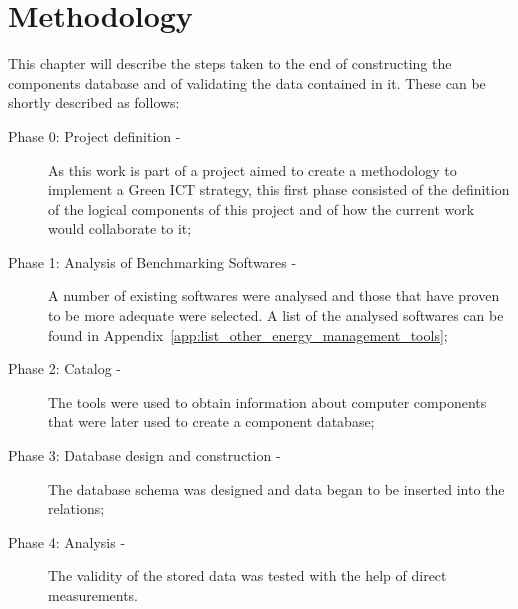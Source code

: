 

\chapter{Methodology} \label{chap3:methodology}

   This chapter will describe the steps taken to the end of constructing the components database and of validating the data contained in it.
These can be shortly described as follows:
    \begin{description}
        \item[Phase 0: Project definition -] As this work is part of a project aimed to create a methodology to implement a Green ICT strategy, this first phase consisted of the definition of the logical components of this project and of how the current work would collaborate to it;
        \item[Phase 1: Analysis of Benchmarking Softwares -] A number of existing softwares were analysed and those that have proven to be more adequate were selected. A list of the analysed softwares can be found in Appendix~\ref{app:list_other_energy_management_tools};
        \item[Phase 2: Catalog -] The tools were used to obtain information about computer components that were later used to create a component database;
        \item[Phase 3: Database design and construction -] The database schema was designed and data began to be inserted into the relations;
        \item[Phase 4: Analysis -] The validity of the stored data was tested with the help of direct measurements.
    \end{description}


